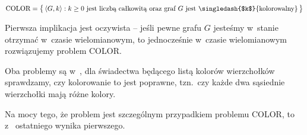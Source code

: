 \subproblem %
\[
	\text{COLOR} = \bigl\{\,\langle G,k\rangle:\text{$k\ge0$ jest liczbą całkowitą oraz graf $G$ jest \singledash{$k$}{kolorowalny}}\,\bigr\}
\]

Pierwsza implikacja jest oczywista -- jeśli pewne  grafu $G$ jesteśmy w~stanie otrzymać w~czasie wielomianowym, to jednocześnie w~czasie wielomianowym rozwiązujemy problem COLOR.


\subproblem %
Oba problemy są w~\NPclass, dla świadectwa będącego listą kolorów wierzchołków sprawdzamy, czy kolorowanie to jest poprawne, tzn.\ czy każde dwa sąsiednie wierzchołki mają różne kolory.

Na mocy tego, że problem  jest szczególnym przypadkiem problemu COLOR, to z~ ostatniego wynika  pierwszego.

\subproblem %
\subproblem %
\subproblem %


\subproblem %
\subproblem %
\subproblem %
\subproblem %

\endinput
